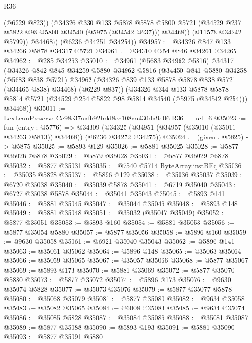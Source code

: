 \begin{lexlean}{R36}
\begin{coremodule}
                (@6229 @823))
              (@34326
                @330
                @133
                @5878
                @5878
                @5800
                @5721
                (@34529 @237 @5822 @98 @5800 @34540 (@5975 (@34542 @237)))
                @34468))
            (@11578 @34242 @5799))
          @34468))
      (@6236 @34251 @34254))
@34957 := @34326 @847 @133 @34266 @5878 @34317 @5721
@34961 := @34310 @254 @846 @34261 @34265
@34962 := @285 @34263
@35010 := @34961
    (@5683 @34962 @5816)
    @34317
    (@34326
      @842
      @845
      @34259
      @5880
      @34962
      @5816
      (@34450
        @841
        @5880
        @34258
        (@5683 @838 @5721)
        @34962
        (@34326 @839 @133 @5878 @5878 @838 @5721 (@34465 @838) @34468)
        (@6229 @837))
      (@34326
        @344
        @133
        @5878
        @5878
        @5814
        @5721
        (@34529 @254 @5822 @98 @5814 @34540 (@5975 (@34542 @254)))
        @34468))
@35011 := LexLeanPreserve.Cc98c37aafb92bdd8ec108aa430da9d06.R36.__rel_6
@35023 := fun (entry : @5776) =>
  @34309 (@34325 (@34951 (@34957 (@35010 (@35011 @34263 @5813)) @34468)) (@6236 @34272 @34275))
@35024 := (given : @5825) -> @5875
@35025 := @5893 @129
@35026 := @5881 @35025
@35028 := @5877 @35026 @5878
@35029 := @5879 @35028
@35031 := @5877 @35029 @5878
@35032 := @5877 @35031
@35035 := @7540 @5714 ByteArray.instBEq
@35036 := @35035 @5828
@35037 := @5896 @129
@35038 := @35036 @35037
@35039 := @6720 @35038
@35040 := @35039 @5878
@35041 := @6719 @35040
@35043 := @6727 @35038 @5878
@35044 := @35041 @35043
@35045 := @5893 @141
@35046 := @5881 @35045
@35047 := @35044 @35046
@35048 := @5893 @148
@35049 := @5881 @35048
@35051 := @35032 (@35047 @35049)
@35052 := @5877 @35051
@35053 := @5893 @160
@35054 := @5881 @35053
@35056 := @5877 @35054 @5880
@35057 := @5877 @35056
@35058 := @5896 @160
@35059 := @9630 @35058
@35061 := @6921 @35040 @35043
@35062 := @5896 @141
@35063 := @35061 @35062
@35064 := @5896 @148
@35065 := @35063 @35064
@35066 := @35059 @35065
@35067 := @35057 @35066
@35068 := @5877 @35067
@35069 := @5893 @173
@35070 := @5881 @35069
@35072 := @5877 @35070 @5880
@35073 := @5877 @35072
@35074 := @5896 @173
@35076 := @9630 @35074 @5828
@35077 := @35073 @35076
@35079 := @5877 @35077 @5878
@35080 := @35068 @35079
@35081 := @5877 @35080
@35082 := @9634 @35058
@35083 := @35082 @35065
@35084 := @6008 @35083
@35085 := @9634 @35074
@35086 := @35085 @5828
@35087 := @35084 @35086
@35088 := @35081 @35087
@35089 := @5877 @35088
@35090 := @5893 @193
@35091 := @5881 @35090
@35093 := @5877 @35091 @5880

\end{coremodule}
\end{lexlean}

